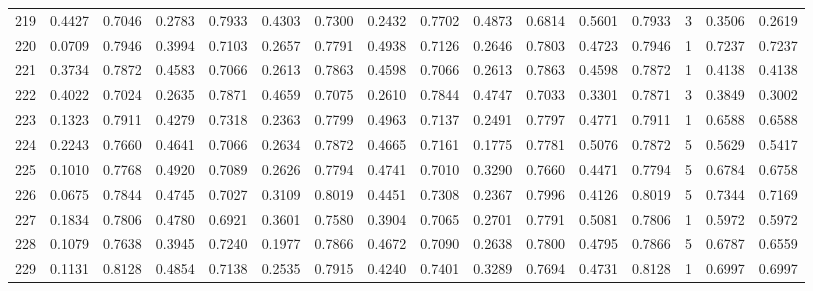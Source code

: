 \begin{tabular}{lrrrrrrrrrrrrrrr}
219 &      0.4427 &  0.7046 &  0.2783 &  0.7933 &  0.4303 &  0.7300 &  0.2432 &  0.7702 &  0.4873 &  0.6814 &   0.5601 &     0.7933 &      3 &                    0.3506 &                     0.2619 \\
220 &      0.0709 &  0.7946 &  0.3994 &  0.7103 &  0.2657 &  0.7791 &  0.4938 &  0.7126 &  0.2646 &  0.7803 &   0.4723 &     0.7946 &      1 &                    0.7237 &                     0.7237 \\
221 &      0.3734 &  0.7872 &  0.4583 &  0.7066 &  0.2613 &  0.7863 &  0.4598 &  0.7066 &  0.2613 &  0.7863 &   0.4598 &     0.7872 &      1 &                    0.4138 &                     0.4138 \\
222 &      0.4022 &  0.7024 &  0.2635 &  0.7871 &  0.4659 &  0.7075 &  0.2610 &  0.7844 &  0.4747 &  0.7033 &   0.3301 &     0.7871 &      3 &                    0.3849 &                     0.3002 \\
223 &      0.1323 &  0.7911 &  0.4279 &  0.7318 &  0.2363 &  0.7799 &  0.4963 &  0.7137 &  0.2491 &  0.7797 &   0.4771 &     0.7911 &      1 &                    0.6588 &                     0.6588 \\
224 &      0.2243 &  0.7660 &  0.4641 &  0.7066 &  0.2634 &  0.7872 &  0.4665 &  0.7161 &  0.1775 &  0.7781 &   0.5076 &     0.7872 &      5 &                    0.5629 &                     0.5417 \\
225 &      0.1010 &  0.7768 &  0.4920 &  0.7089 &  0.2626 &  0.7794 &  0.4741 &  0.7010 &  0.3290 &  0.7660 &   0.4471 &     0.7794 &      5 &                    0.6784 &                     0.6758 \\
226 &      0.0675 &  0.7844 &  0.4745 &  0.7027 &  0.3109 &  0.8019 &  0.4451 &  0.7308 &  0.2367 &  0.7996 &   0.4126 &     0.8019 &      5 &                    0.7344 &                     0.7169 \\
227 &      0.1834 &  0.7806 &  0.4780 &  0.6921 &  0.3601 &  0.7580 &  0.3904 &  0.7065 &  0.2701 &  0.7791 &   0.5081 &     0.7806 &      1 &                    0.5972 &                     0.5972 \\
228 &      0.1079 &  0.7638 &  0.3945 &  0.7240 &  0.1977 &  0.7866 &  0.4672 &  0.7090 &  0.2638 &  0.7800 &   0.4795 &     0.7866 &      5 &                    0.6787 &                     0.6559 \\
229 &      0.1131 &  0.8128 &  0.4854 &  0.7138 &  0.2535 &  0.7915 &  0.4240 &  0.7401 &  0.3289 &  0.7694 &   0.4731 &     0.8128 &      1 &                    0.6997 &                     0.6997 \\

\end{tabular}
